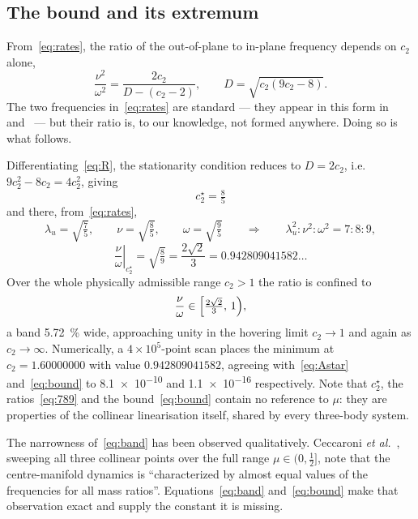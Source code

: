 \documentclass[11pt,a4paper]{article}
\begin{document}
\subsection{The bound and its extremum}

From~\eqref{eq:rates}, the ratio of the out-of-plane to in-plane frequency
depends on $c_2$ alone,
\begin{equation}
  \frac{\nu^{2}}{\omega^{2}} = \frac{2c_2}{D-(c_2-2)},
  \qquad D=\sqrt{c_2(9c_2-8)} .
  \label{eq:R}
\end{equation}
The two frequencies in~\eqref{eq:rates} are standard --- they appear in this
form in~\cite{gomez2001} and~\cite{ceccaroni2016} --- but their ratio is, to our
knowledge, not formed anywhere. Doing so is what follows.

Differentiating~\eqref{eq:R}, the stationarity condition reduces to $D=2c_2$,
i.e. $9c_2^{2}-8c_2=4c_2^{2}$, giving
\begin{equation}
  \boxed{\;c_2^\star = \tfrac{8}{5}\;}
  \label{eq:Astar}
\end{equation}
and there, from~\eqref{eq:rates},
\begin{equation}
  \lambda_u = \sqrt{\tfrac{7}{5}},\qquad
  \nu = \sqrt{\tfrac{8}{5}},\qquad
  \omega = \sqrt{\tfrac{9}{5}}
  \qquad\Longrightarrow\qquad
  \lambda_u^{2}:\nu^{2}:\omega^{2} = 7:8:9 ,
  \label{eq:789}
\end{equation}
\begin{equation}
  \left.\frac{\nu}{\omega}\right|_{c_2^\star} = \sqrt{\tfrac{8}{9}}
  = \frac{2\sqrt2}{3} = 0.942809041582\ldots
  \label{eq:bound}
\end{equation}
Over the whole physically admissible range $c_2>1$ the ratio is confined to
\begin{equation}
  \frac{\nu}{\omega} \in \Bigl[\tfrac{2\sqrt2}{3},\,1\Bigr) ,
  \label{eq:band}
\end{equation}
a band \SI{5.72}{\percent} wide, approaching unity in the hovering limit
$c_2\to1$ and again as $c_2\to\infty$. Numerically, a $4\times10^{5}$-point scan
places the minimum at $c_2=1.60000000$ with value $0.942809041582$, agreeing
with~\eqref{eq:Astar} and~\eqref{eq:bound} to \num{8.1e-10} and \num{1.1e-16}
respectively. Note that $c_2^\star$, the ratios~\eqref{eq:789} and the
bound~\eqref{eq:bound} contain no reference to $\mu$: they are properties of the
collinear linearisation itself, shared by every three-body system.

The narrowness of~\eqref{eq:band} has been observed qualitatively. Ceccaroni
\emph{et al.}~\cite{ceccaroni2016}, sweeping all three collinear points over the
full range $\mu\in(0,\tfrac12]$, note that the centre-manifold dynamics is
``characterized by almost equal values of the frequencies for all mass
ratios''. Equations~\eqref{eq:band} and~\eqref{eq:bound} make that observation
exact and supply the constant it is missing.
\end{document}
